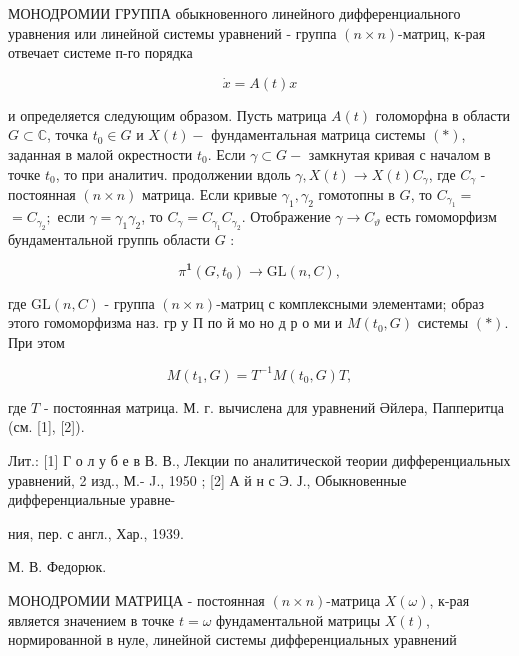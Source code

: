 \documentclass[10pt]{article}
\begin{document}
МОНОДРОМИИ ГРУППА обыкновенного линейного дифференциального уравнения или линейной системы уравнений - группа $(n \times n)$-матриц, к-рая отвечает системе п-го порядка



\[

\dot{x}=A(t) x

\]



и определяется следующим образом. Пусть матрица $A(t)$ голоморфна в области $G \subset \mathbb{C}$, точка $t_{0} \in G$ и $X(t)-$ фундаментальная матрица системы $(*)$, заданная в малой окрестности $t_{0}$. Если $\gamma \subset G-$ замкнутая кривая с началом в точке $t_{0}$, то при аналитич. продолжении вдоль $\gamma, X(t) \rightarrow X(t) C_{\gamma}$, где $C_{\gamma}$ - постоянная $(n \times n)$ матрица. Если кривые $\gamma_{1}, \gamma_{2}$ гомотопны в $G$, то $C_{\gamma_{1}}=$ $=C_{\gamma_{2}} ;$ если $\gamma=\gamma_{1} \gamma_{2}$, то $C_{\gamma}=C_{\gamma_{1}} C_{\gamma_{2}}$. Отображение $\gamma \rightarrow C_{\vartheta}$ есть гомоморфизм бундаментальной группь области $G$ :



\[

\pi^{\mathbf{1}}\left(G, t_{0}\right) \rightarrow \mathrm{GL}(n, C),

\]



где $\mathrm{GL}(n, C)$ - группа $(n \times n)$-матриц с комплексными элементами; образ этого гомоморфизма наз. гр у П по й мо но д р о ми и $M\left(t_{0}, G\right)$ системы $(*)$. При этом



\[

M\left(t_{1}, G\right)=T^{-1} M\left(t_{0}, G\right) T,

\]



где $T$ - постоянная матрица. М. г. вычислена для уравнений Әйлера, Папперитца (см. [1], [2]).



Лит.: [1] Г о л у б е в В. В., Лекции по аналитической теории дифференциальных уравнений, 2 изд., М.- J., 1950 ; [2] А й н с Э. Ј., Обыкновенные дифференциальные уравне-

ния, пер. с англ., Хар., 1939.

М. В. Федорюк.



МОНОДРОМИИ МАТРИЦА - постоянная $(n \times n)$-матрица $X(\omega)$, к-рая является значением в точке $t=\omega$ фундаментальной матрицы $X(t)$, нормированной в нуле, линейной системы дифференциальных уравнений
\end{document}
